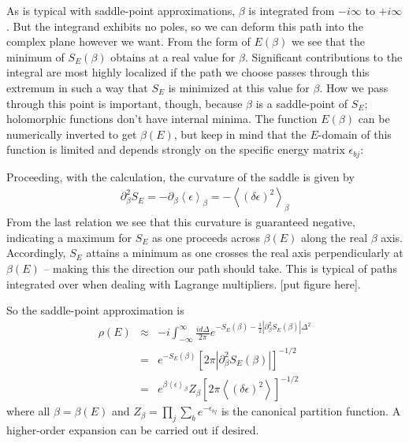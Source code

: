 \documentclass[11pt]{article}
\newcommand{\bea}{\begin{eqnarray}}
\newcommand{\eea}{\end{eqnarray}}
\newcommand{\braket}[1]{\left \langle #1 \right \rangle}
\begin{document}
As is typical with saddle-point approximations, $\beta$ is integrated from $-i \infty$ to $+ i \infty$. But the integrand exhibits no poles, so we can deform this path into the complex plane however we want. From the form of $E(\beta)$ we see that the minimum of $S_E (\beta)$ obtains at a real value for $\beta$. Significant contributions to the integral are most highly localized if the path we choose passes through this extremum in such a way that $S_E$ is minimized at this value for $\beta$. How we pass through this point is important, though, because $\beta$ is a saddle-point of $S_E$; holomorphic functions don't have internal minima. The function $E(\beta)$ can be numerically inverted to get $\beta(E)$, but keep in mind that the $E$-domain of this function is limited and depends strongly on the specific energy matrix $\epsilon_{bj}$: 

Proceeding, with the calculation, the curvature of the saddle is given by
\bea
\partial^2_{\beta} S_E = - \partial_{\beta} \braket{\epsilon}_{\beta} = - \braket{(\delta \epsilon)^2}_{\beta}
\eea
From the last relation we see that this curvature is guaranteed negative, indicating a maximum for $S_E$ as one proceeds across $\beta(E)$ along the real $\beta$ axis. Accordingly, $S_E$ attains a minimum as one crosses the real axis perpendicularly at $\beta(E)$ -- making this the direction our path should take. This is typical of paths integrated over when dealing with Lagrange multipliers. [put figure here]. 

So the saddle-point approximation is
\bea
\rho(E) &\approx &  -i  \int_{-\infty}^{\infty} \frac{i d\Delta}{2 \pi} e^{-S_E(\beta) - \frac{1}{2} | \partial^2_{\beta} S_{E}(\beta) | \Delta^2}  \\
& = & e^{- S_E (\beta)} \left[ 2 \pi \left| \partial^2_{\beta} S_{E}(\beta) \right| \right]^{-1/2} \\
& = & e^{\beta \braket{\epsilon}_{\beta} } Z_{\beta} \left[ 2 \pi \braket{(\delta \epsilon)^2} \right]^{-1/2}
\eea
where all $\beta = \beta(E)$ and $Z_{\beta} = \prod_j \sum_b e^{-\epsilon_{bj}}$ is the canonical partition function. A higher-order expansion can be carried out if desired.
\end{document}
